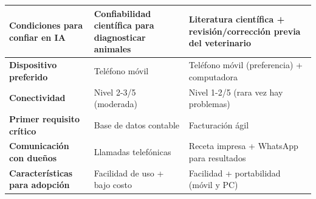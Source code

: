 \documentclass[
]{article}
\newcounter{none} %
\begin{document}
{\def\LTcaptype{none} %
\begin{longtable}[]{|
  >{\raggedright\arraybackslash}p{}|
  >{\raggedright\arraybackslash}p{}|
  >{\raggedright\arraybackslash}p{}|}
\hline
\begin{minipage}[b]{\linewidth}\raggedright
\textbf{Condiciones para confiar en IA}
\end{minipage} & \begin{minipage}[b]{\linewidth}\raggedright
Confiabilidad científica para diagnosticar animales
\end{minipage} & \begin{minipage}[b]{\linewidth}\raggedright
Literatura científica + revisión/corrección previa del veterinario
\end{minipage} \\
\hline
\endhead
\hline
\endlastfoot
\textbf{Dispositivo preferido} &
\begin{minipage}[t]{\linewidth}\raggedright
Teléfono móvil
\end{minipage} & \begin{minipage}[t]{\linewidth}\raggedright
Teléfono móvil (preferencia) + computadora
\end{minipage} \\
\hline
\textbf{Conectividad} & \begin{minipage}[t]{\linewidth}\raggedright
Nivel 2-3/5 (moderada)
\end{minipage} & \begin{minipage}[t]{\linewidth}\raggedright
Nivel 1-2/5 (rara vez hay problemas)
\end{minipage} \\
\hline
\textbf{Primer requisito crítico} &
\begin{minipage}[t]{\linewidth}\raggedright
Base de datos contable
\end{minipage} & \begin{minipage}[t]{\linewidth}\raggedright
Facturación ágil
\end{minipage} \\
\hline
\textbf{Comunicación con dueños} &
\begin{minipage}[t]{\linewidth}\raggedright
Llamadas telefónicas
\end{minipage} & \begin{minipage}[t]{\linewidth}\raggedright
Receta impresa + WhatsApp para resultados
\end{minipage} \\
\hline
\textbf{Características para adopción} &
\begin{minipage}[t]{\linewidth}\raggedright
Facilidad de uso + bajo costo
\end{minipage} & \begin{minipage}[t]{\linewidth}\raggedright
Facilidad + portabilidad (móvil y PC)
\end{minipage} \\
\hline
\end{longtable}
}
\end{document}
